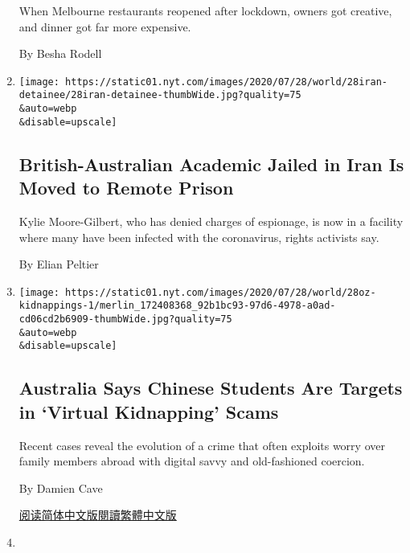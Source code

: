\begin{enumerate}
  When Melbourne restaurants reopened after lockdown, owners got
  creative, and dinner got far more expensive.

  By Besha Rodell
\item
  \href{/2020/07/28/world/europe/british-australian-academic-jail-iran-qarchak.html}{}

  \texttt{[image: https://static01.nyt.com/images/2020/07/28/world/28iran-detainee/28iran-detainee-thumbWide.jpg?quality=75\\\&auto=webp\\\&disable=upscale]}

  \hypertarget{british-australian-academic-jailed-in-iran-is-moved-to-remote-prison}{%
  \subsection{British-Australian Academic Jailed in Iran Is Moved to
  Remote
  Prison}\label{british-australian-academic-jailed-in-iran-is-moved-to-remote-prison}}

  Kylie Moore-Gilbert, who has denied charges of espionage, is now in a
  facility where many have been infected with the coronavirus, rights
  activists say.

  By Elian Peltier
\item
  \href{/2020/07/28/world/australia/chinese-students-virtual-kidnapping.html}{}

  \texttt{[image: https://static01.nyt.com/images/2020/07/28/world/28oz-kidnappings-1/merlin\_172408368\_92b1bc93-97d6-4978-a0ad-cd06cd2b6909-thumbWide.jpg?quality=75\\\&auto=webp\\\&disable=upscale]}

  \hypertarget{australia-says-chinese-students-are-targets-in-virtual-kidnapping-scams}{%
  \subsection{Australia Says Chinese Students Are Targets in `Virtual
  Kidnapping'
  Scams}\label{australia-says-chinese-students-are-targets-in-virtual-kidnapping-scams}}

  Recent cases reveal the evolution of a crime that often exploits worry
  over family members abroad with digital savvy and old-fashioned
  coercion.

  By Damien Cave

  \href{https://cn.nytimes.com/asia-pacific/20200729/chinese-students-virtual-kidnapping/}{阅读简体中文版}\href{https://cn.nytimes.com/asia-pacific/20200729/chinese-students-virtual-kidnapping/zh-hant/}{閱讀繁體中文版}
\item
  \href{/2020/07/24/world/australia/behrouz-boochani-asylum-new-zealand.html}{}


\end{enumerate}
